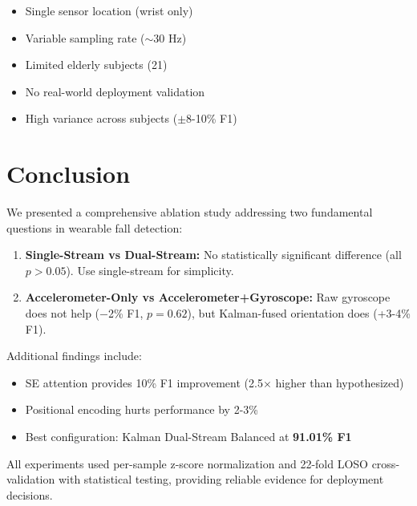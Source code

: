 \documentclass{article}
\begin{document}
\begin{itemize}
    \item Single sensor location (wrist only)
    \item Variable sampling rate ($\sim$30 Hz)
    \item Limited elderly subjects (21)
    \item No real-world deployment validation
    \item High variance across subjects ($\pm$8-10\% F1)
\end{itemize}

\section{Conclusion}

We presented a comprehensive ablation study addressing two fundamental questions in wearable fall detection:

\begin{enumerate}
    \item \textbf{Single-Stream vs Dual-Stream:} No statistically significant difference (all $p > 0.05$). Use single-stream for simplicity.

    \item \textbf{Accelerometer-Only vs Accelerometer+Gyroscope:} Raw gyroscope does not help ($-$2\% F1, $p = 0.62$), but Kalman-fused orientation does (+3-4\% F1).
\end{enumerate}

Additional findings include:
\begin{itemize}
    \item SE attention provides 10\% F1 improvement (2.5$\times$ higher than hypothesized)
    \item Positional encoding hurts performance by 2-3\%
    \item Best configuration: Kalman Dual-Stream Balanced at \textbf{91.01\% F1}
\end{itemize}

All experiments used per-sample z-score normalization and 22-fold LOSO cross-validation with statistical testing, providing reliable evidence for deployment decisions.

\end{document}
